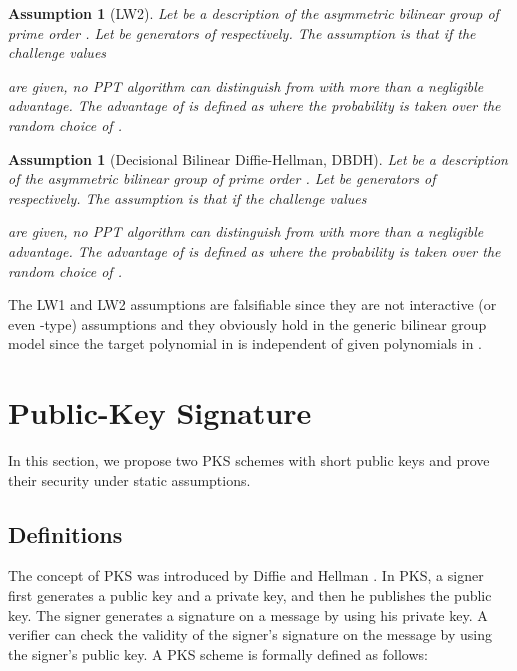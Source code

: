 \documentclass[11pt,letterpaper]{article}
\newtheorem{assumption}[theorem]{Assumption}
\begin{document}
\begin{assumption}[LW2]
Let  be a description of the asymmetric bilinear
group of prime order . Let  be generators of 
respectively. The assumption is that if the challenge values
    
are given, no PPT algorithm  can distinguish  from
 with more than a negligible advantage. The advantage of
 is defined as  where the probability is taken over
the random choice of .
\end{assumption}

\begin{assumption}[Decisional Bilinear Diffie-Hellman, DBDH]
Let  be a description of the asymmetric bilinear
group of prime order . Let  be generators of 
respectively. The assumption is that if the challenge values
    
are given, no PPT algorithm  can distinguish  from  with more than a
negligible advantage. The advantage of  is defined as
 where the probability is taken over the random choice of .
\end{assumption}

The LW1 and LW2 assumptions are falsifiable since they are not interactive
(or even -type) assumptions and they obviously hold in the generic
bilinear group model since the target polynomial in  is independent of
given polynomials in .

\section{Public-Key Signature} \label{sec:pks}

In this section, we propose two PKS schemes with short public keys and prove
their security under static assumptions.

\subsection{Definitions}

The concept of PKS was introduced by Diffie and Hellman \cite{DiffieH76}. In
PKS, a signer first generates a public key and a private key, and then he
publishes the public key. The signer generates a signature on a message by
using his private key. A verifier can check the validity of the signer's
signature on the message by using the signer's public key. A PKS scheme is
formally defined as follows:
\end{document}
